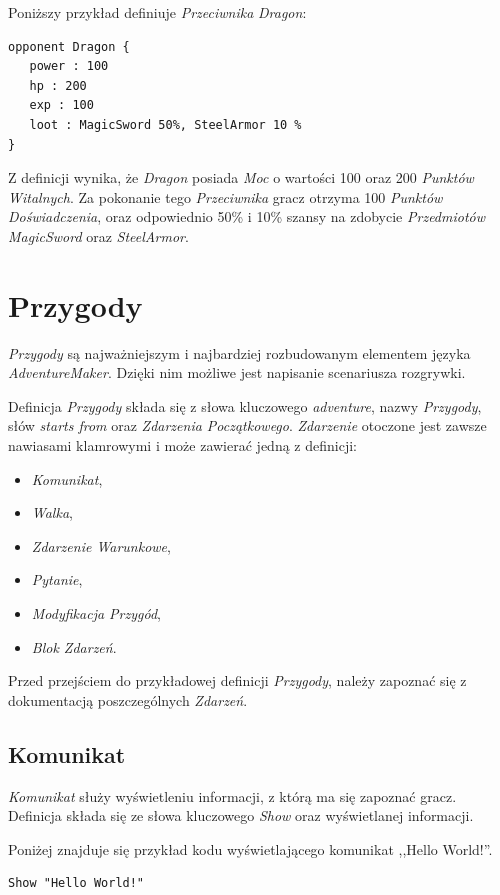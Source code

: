 \documentclass[openright]{xmgr}
\begin{document}
Poniższy przykład definiuje \textit{Przeciwnika} \textit{Dragon}:

\begin{verbatim}
opponent Dragon {
   power : 100
   hp : 200
   exp : 100
   loot : MagicSword 50%, SteelArmor 10 %
}
\end{verbatim}

Z definicji wynika, że \textit{Dragon} posiada \textit{Moc} o wartości 100 oraz 200 \textit{Punktów Witalnych}. Za pokonanie tego \textit{Przeciwnika} gracz otrzyma 100 \textit{Punktów Doświadczenia}, oraz odpowiednio 50\% i 10\% szansy na zdobycie \textit{Przedmiotów} \textit{MagicSword} oraz \textit{SteelArmor}.

\section{Przygody}
\textit{Przygody} są najważniejszym i najbardziej rozbudowanym elementem języka \textit{AdventureMaker}. Dzięki nim możliwe jest napisanie scenariusza rozgrywki. 

Definicja \textit{Przygody} składa się z słowa kluczowego \textit{adventure}, nazwy \textit{Przygody}, słów \textit{starts from} oraz \textit{Zdarzenia Początkowego}. \textit{Zdarzenie} otoczone jest zawsze nawiasami klamrowymi i może zawierać jedną z definicji:
\begin{itemize}
	\item \textit{Komunikat},
	\item \textit{Walka},
	\item \textit{Zdarzenie Warunkowe},
	\item \textit{Pytanie},
	\item \textit{Modyfikacja Przygód},
	\item \textit{Blok Zdarzeń}.
\end{itemize}

Przed przejściem do przykładowej definicji \textit{Przygody}, należy zapoznać się z dokumentacją poszczególnych \textit{Zdarzeń}.
\subsection*{Komunikat}
\textit{Komunikat} służy wyświetleniu informacji, z którą ma się zapoznać gracz. Definicja składa się ze słowa kluczowego \textit{Show} oraz wyświetlanej informacji.

Poniżej znajduje się przykład kodu wyświetlającego komunikat ,,Hello World!''.
\begin{verbatim}
Show "Hello World!"
\end{verbatim}
\end{document}
